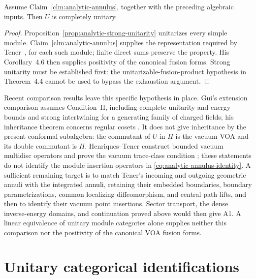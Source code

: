 \begin{theorem}
\label{thm:analytic-complete-unitarity}
Assume Claim~\ref{clm:analytic-annulus}, together with the preceding
algebraic inputs.  Then $U$ is completely
unitary.
\end{theorem}
\begin{proof}
Proposition~\ref{prop:analytic-strong-unitarity} unitarizes every simple
module.  Claim~\ref{clm:analytic-annulus} supplies the representation
required by
Tener~\cite[Definition~2.18]{TenFusion}, for each such module; finite direct sums
preserve the property.  His Corollary~4.6 then supplies positivity of
the canonical fusion forms.  Strong unitarity must be established first:
the unitarizable-fusion-product hypothesis in Theorem~4.4 cannot be used
to bypass the exhaustion argument.
\end{proof}

Recent comparison results leave this specific hypothesis in place.
Gui's extension comparison assumes Condition~II, including complete
unitarity and energy bounds and strong intertwining for a generating
family of charged fields; his inheritance theorem concerns regular
cosets \cite[Definition~4.15 and Theorems~4.20,~6.11]{GuiCompare}.
It does not give inheritance by the present conformal subalgebra:
the commutant of $U$ in $H$ is the vacuum VOA and its double
commutant is $H$.  Henriques--Tener construct bounded vacuum
multidisc operators and prove the vacuum trace-class condition
\cite[Theorems~3.6 and~4.1]{HTGenusZero}; these statements do not
identify the module insertion operators in
\eqref{eq:analytic-annulus-identity}.  A sufficient remaining target
is to match Tener's incoming and outgoing geometric annuli with the
integrated annuli, retaining their embedded boundaries, boundary
parametrizations, common localizing diffeomorphism, and central path
lifts, and then to identify their vacuum point insertions.  Sector
transport, the dense inverse-energy domains, and continuation proved
above would then give A1.  A linear equivalence of unitary module
categories alone supplies neither this comparison nor the positivity
of the canonical VOA fusion forms.

\section{Unitary categorical identifications}
\label{sec:analytic-category}


